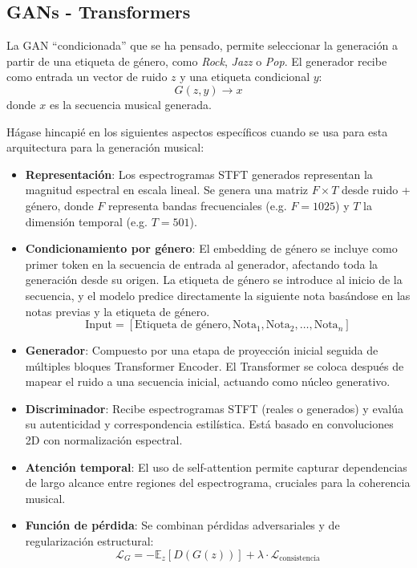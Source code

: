 \subsection{GANs - Transformers}

La GAN ``condicionada'' que se ha pensado, permite seleccionar la generación a partir de una etiqueta de género, como \textit{Rock}, \textit{Jazz} o \textit{Pop}. El generador recibe como entrada un vector de ruido \( z \) y una etiqueta condicional \( y \):
\[
G(z, y) \rightarrow x
\]
donde \( x \) es la secuencia musical generada. 

Hágase hincapié en los siguientes aspectos específicos cuando se usa para esta arquitectura para la generación musical:

\begin{itemize}
  \item \textbf{Representación}: Los espectrogramas STFT generados representan la magnitud espectral en escala lineal. Se genera una matriz $F \times T$ desde ruido + género, donde $F$ representa bandas frecuenciales (e.g. $F=1025$) y $T$ la dimensión temporal (e.g. $T=501$).
  \item \textbf{Condicionamiento por género}: El embedding de género se incluye como primer token en la secuencia de entrada al generador, afectando toda la generación desde su origen.
  La etiqueta de género se introduce al inicio de la secuencia, y el modelo predice directamente la siguiente nota basándose en las notas previas y la etiqueta de género.
    \[
    \text{Input} = [\text{Etiqueta de género}, \text{Nota}_1, \text{Nota}_2, \ldots, \text{Nota}_n]
    \]
  \item \textbf{Generador}: Compuesto por una etapa de proyección inicial seguida de múltiples bloques Transformer Encoder. El Transformer se coloca después de mapear el ruido a una secuencia inicial, actuando como núcleo generativo.
  \item \textbf{Discriminador}: Recibe espectrogramas STFT (reales o generados) y evalúa su autenticidad y correspondencia estilística. Está basado en convoluciones 2D con normalización espectral.
  \item \textbf{Atención temporal}: El uso de self-attention permite capturar dependencias de largo alcance entre regiones del espectrograma, cruciales para la coherencia musical.
  \item \textbf{Función de pérdida}: Se combinan pérdidas adversariales y de regularización estructural:
    \[
    \mathcal{L}_G = -\mathbb{E}_{z}[D(G(z))] + \lambda \cdot \mathcal{L}_{\text{consistencia}}
\]
\end{itemize}
